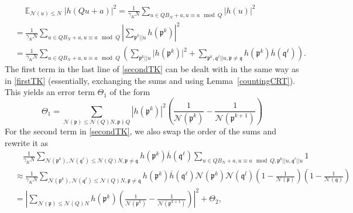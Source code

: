 \documentclass[11pt]{amsart}
\theoremstyle{definition}
\DeclareMathOperator*{\E}{\mathbb{E}}
\newcommand{\NN}{{\mathcal N}}
\newcommand{\Z}{{\mathbb Z}}
\newcommand{\mf}{\mathfrak}
\begin{document}
\begin{equation}\label{secondTK}
    \begin{split}
        &\quad \E_{\NN(u) \leq N}\vert h(Qu+a)\vert^{2}
        =\frac{1}{\gamma_{K} N}\sum_{u\in  QB_N+a, u\equiv a \mod Q}\vert h(u)\vert^{2}
        \\&=\frac{1}{\gamma_{K} N}\sum_{u\in  QB_N+a, u\equiv a \mod Q}\left| \sum_{\mf p^{k}|| u} h(\mf p^{k})\right|^{2}
        \\&=\frac{1}{\gamma_{K} N}\sum_{u\in  QB_N+a, u\equiv a \mod Q}\left(\sum_{\mf p^{k}|| u} \vert h(\mf p^{k})\vert^{2}+\sum_{\mf p^{k},\mf q^{\ell}|| u, \mf p\neq \mf q} h(\mf p^{k})\overline{h}(\mf q^{\ell})\right). 
    \end{split}
\end{equation}
The first term in the last line of \eqref{secondTK} can be dealt with in the same way as in \eqref{firstTK} (essentially, exchanging the sums and using Lemma~\ref{countingCRT}). This yields an error term $\Theta_1$ of the form
\[
\Theta_1=\sum_{\NN(\mf p) \leq \NN(Q)N, \mf p \nmid Q} |h(\mf p^k)|^2 \left( \frac{1}{\NN(\mf p^k)}-\frac{1}{\NN(\mf p^{k+1})}\right)
\]
For the second term in \eqref{secondTK}, we also swap the order of the sums and rewrite it as
\begin{equation}
    \begin{split}
        &\quad \frac{1}{\gamma_{K} N}\sum_{\NN(\mf p^{k}),\NN(\mf q^{\ell}) \leq \NN(Q)N, \mf p\neq \mf q} h(\mf p^{k})\overline{h}(\mf q^{\ell})\sum_{u\in QB_N+a, u\equiv a \mod Q, \mf p^{k}||u, \mf q^{\ell}||u}1
        \\&\approx \frac{1}{\gamma_{K} N}\sum_{\NN(\mf p^{k}),\NN(\mf q^{\ell})\leq \NN(Q)N, \mf p\neq \mf q} h(\mf p^{k})\overline{h}(\mf q^{\ell})\NN(\mf p^k)\NN(\mf q^l)\left(1-\frac{1}{\NN(\mf p)}\right) \left(1-\frac{1}{\NN(\mf q)}\right)
        \\&= \left|\sum_{\NN(\mf p) \leq \NN(Q)N} h(\mf p^{k})\left( \frac{1}{\NN(\mf p^k)}-\frac{1}{\NN(\mf p^{k+1})}\right)\right|^2+\Theta_2,
    \end{split}
\end{equation}
\end{document}
